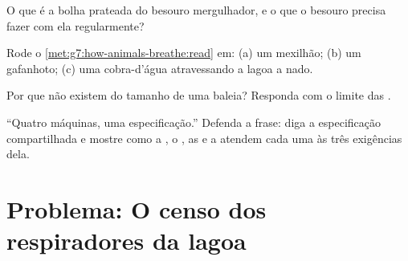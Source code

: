 \begin{exercise}[$\star\star$]\label{exo:g7:how-animals-breathe:9}
O que é a bolha prateada do besouro mergulhador, e o que o besouro
precisa fazer com ela regularmente?
\end{exercise}

\begin{exercise}[$\star\star$]\label{exo:g7:how-animals-breathe:10}
Rode o \cref{met:g7:how-animals-breathe:read} em: (a) um mexilhão;
(b) um gafanhoto; (c) uma cobra-d'água atravessando a lagoa a nado.
\end{exercise}

\begin{exercise}[$\star\star$]\label{exo:g7:how-animals-breathe:11}
Por que não existem  do tamanho de uma baleia? Responda com o
limite das .
\end{exercise}

\begin{exercise}[$\star\star\star$]\label{exo:g7:how-animals-breathe:12}
``Quatro máquinas, uma especificação.'' Defenda a frase: diga a
especificação compartilhada e mostre como a , o , as
 e a  atendem cada uma às três exigências dela.
\end{exercise}

\section{Problema: O censo dos respiradores da lagoa}

